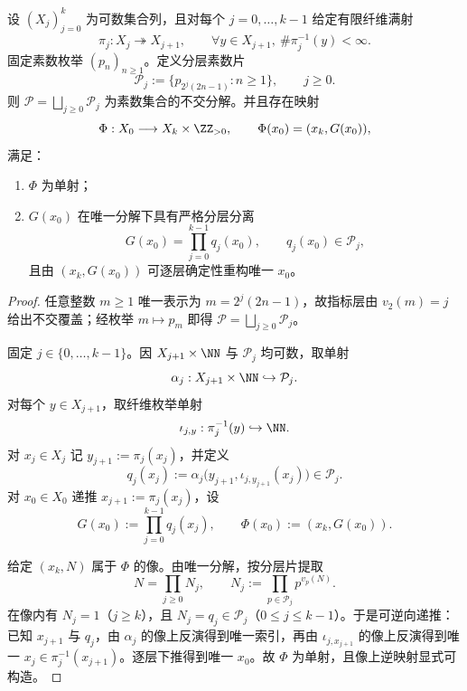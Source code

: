 \begin{theorem}[分层素数片上的有限深度投影可逆化外置]\label{thm:killo-layered-prime-slices-finite-depth}
设 \((X_j)_{j=0}^{k}\) 为可数集合列，且对每个 \(j=0,\dots,k-1\) 给定有限纤维满射
\[
\pi_j:X_j\twoheadrightarrow X_{j+1},
\qquad
\forall y\in X_{j+1},\ \#\pi_j^{-1}(y)<\infty.
\]
固定素数枚举 \((p_n)_{n\ge 1}\)。定义分层素数片
\[
\mathcal P_j:=\{p_{2^j(2n-1)}:n\ge 1\},\qquad j\ge 0.
\]
则 \(\mathcal P=\bigsqcup_{j\ge 0}\mathcal P_j\) 为素数集合的不交分解。并且存在映射
\[
\Phi:X_0\longrightarrow X_k\times \ZZ_{>0},\qquad
\Phi(x_0)=(x_k,G(x_0)),
\]
满足：
\begin{enumerate}
\item \(\Phi\) 为单射；
\item \(G(x_0)\) 在唯一分解下具有严格分层分离
\[
G(x_0)=\prod_{j=0}^{k-1}q_j(x_0),\qquad q_j(x_0)\in \mathcal P_j,
\]
且由 \((x_k,G(x_0))\) 可逐层确定性重构唯一 \(x_0\)。
\end{enumerate}
\end{theorem}
\begin{proof}
任意整数 \(m\ge 1\) 唯一表示为 \(m=2^j(2n-1)\)，故指标层由 \(v_2(m)=j\) 给出不交覆盖；经枚举 \(m\mapsto p_m\) 即得 \(\mathcal P=\bigsqcup_{j\ge 0}\mathcal P_j\)。

固定 \(j\in\{0,\dots,k-1\}\)。因 \(X_{j+1}\times\NN\) 与 \(\mathcal P_j\) 均可数，取单射
\[
\alpha_j:X_{j+1}\times\NN\hookrightarrow \mathcal P_j.
\]
对每个 \(y\in X_{j+1}\)，取纤维枚举单射
\[
\iota_{j,y}:\pi_j^{-1}(y)\hookrightarrow\NN.
\]
对 \(x_j\in X_j\) 记 \(y_{j+1}:=\pi_j(x_j)\)，并定义
\[
q_j(x_j):=\alpha_j\!\bigl(y_{j+1},\iota_{j,y_{j+1}}(x_j)\bigr)\in\mathcal P_j.
\]
对 \(x_0\in X_0\) 递推 \(x_{j+1}:=\pi_j(x_j)\)，设
\[
G(x_0):=\prod_{j=0}^{k-1}q_j(x_j),\qquad
\Phi(x_0):=(x_k,G(x_0)).
\]

给定 \((x_k,N)\) 属于 \(\Phi\) 的像。由唯一分解，按分层片提取
\[
N=\prod_{j\ge 0}N_j,\qquad
N_j:=\prod_{p\in\mathcal P_j}p^{v_p(N)}.
\]
在像内有 \(N_j=1\)（\(j\ge k\)），且 \(N_j=q_j\in\mathcal P_j\)（\(0\le j\le k-1\)）。于是可逆向递推：已知 \(x_{j+1}\) 与 \(q_j\)，由 \(\alpha_j\) 的像上反演得到唯一索引，再由 \(\iota_{j,x_{j+1}}\) 的像上反演得到唯一 \(x_j\in\pi_j^{-1}(x_{j+1})\)。逐层下推得到唯一 \(x_0\)。故 \(\Phi\) 为单射，且像上逆映射显式可构造。
\end{proof}


